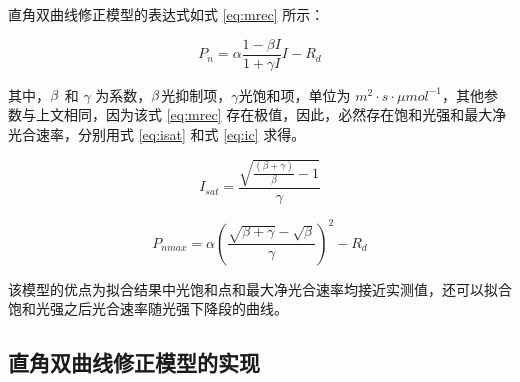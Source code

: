 \documentclass[]{krantz}
\theoremstyle{definition}
\theoremstyle{definition}
\theoremstyle{definition}
\theoremstyle{remark}
\begin{document}
\citet{YEZiPiao2010} 直角双曲线修正模型的表达式如式 \eqref{eq:mrec} 所示：

\begin{equation}
P_{n} = \alpha \frac{1-\beta I}{1+\gamma I} I - R_{d}
\label{eq:mrec}
\end{equation}

其中，\(\text{\ensuremath{\beta}}\) 和 \(\gamma\)
为系数，\(\text{\ensuremath{\beta}}\)光抑制项，\(\gamma\)光饱和项，单位为
\(m^{2}\cdot s\cdot\mu mol^{-1}\)，其他参数与上文相同，因为该式
\eqref{eq:mrec} 存在极值，因此，必然存在饱和光强和最大净光合速率，分别用式
\eqref{eq:isat} 和式 \eqref{eq:ic} 求得。

\begin{equation}
I_{sat} = \frac{\sqrt{\frac{(\beta+\gamma)}{\beta}-1}}{\gamma}
\label{eq:isat}
\end{equation}

\begin{equation}
P_{nmax} = \alpha\left(\frac{\sqrt{\beta+\gamma}-\sqrt{\beta}}{\gamma}\right)^{2}-R_{d}
\label{eq:ic}
\end{equation}

该模型的优点为拟合结果中光饱和点和最大净光合速率均接近实测值，还可以拟合饱和光强之后光合速率随光强下降段的曲线。

\subsection{直角双曲线修正模型的实现}\label{rev_rec_exam}
\end{document}
